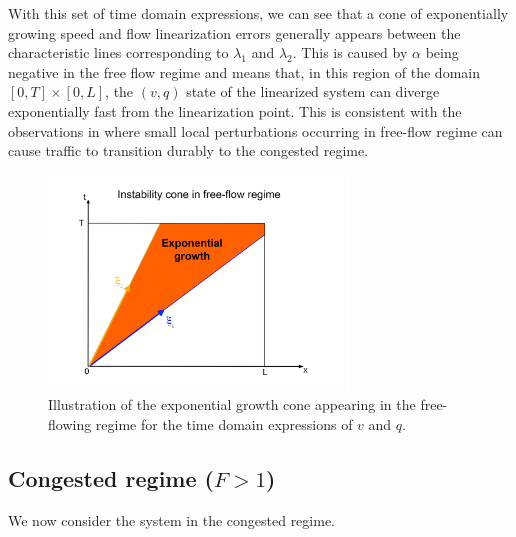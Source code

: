 \documentclass[preprint]{elsarticle}
\begin{document}
With this set of time domain expressions, we can see that a cone of exponentially growing speed and flow linearization errors generally appears between the characteristic lines corresponding to $\lambda_{1}$ and $\lambda_{2}$. This is caused by $\alpha$ being negative in the free flow regime and means that, in this region of the domain $\left[0,T\right] \times \left[0,L\right]$, the $\left(v,q\right)$ state of the linearized system can diverge exponentially fast from the linearization point. This is consistent with the observations in \cite{PhysRevLett.79.4030} where small local perturbations occurring in free-flow regime can cause traffic to transition durably to the congested regime.

\begin{figure}
\begin{centering}
\includegraphics[width=8cm]{Exp-growth}
\par\end{centering}
\protect\caption{Illustration of the exponential growth cone appearing in the free-flowing regime for the time domain expressions of $v$ and $q$.\label{Exp-growth}}
\end{figure}

\subsection{Congested regime ($F>1$)}
We now consider the system in the congested regime.
\end{document}

